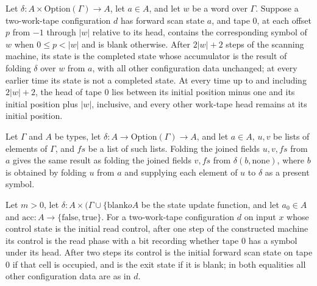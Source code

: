 \begin{theorem}
\label{Turing.rt_find_scan}
\leanok
{}
Let $\delta:A\times\mathrm{Option}(\Gamma)\to A$, let $a\in A$, and let $w$ be a word
over $\Gamma$. Suppose a two-work-tape configuration $d$ has forward scan state $a$, and
tape 0, at each offset $p$ from $-1$ through $|w|$ relative to its head, contains the
corresponding symbol of $w$ when $0\le p<|w|$ and is blank otherwise. After $2|w|+2$
steps of the scanning machine, its state is the completed state whose accumulator is the
result of folding $\delta$ over $w$ from $a$, with all other configuration data
unchanged; at every earlier time its state is not a completed state. At every time up to
and including $2|w|+2$, the head of tape 0 lies between its initial position minus one
and its initial position plus $|w|$, inclusive, and every other work-tape head remains
at its initial position.
\end{theorem}

\begin{theorem}
\label{Turing.rt_find_fold_cons}
\leanok
{}
Let $\Gamma$ and $A$ be types, let $\delta:A\to\mathrm{Option}(\Gamma)\to A$, and
let $a\in A$, $u,v$ be lists of elements of $\Gamma$, and $fs$ be a list of such lists.
Folding the joined fields $u,v,fs$ from $a$ gives the same result as folding the joined
fields $v,fs$ from $\delta(b,\mathrm{none})$, where $b$ is obtained by folding $u$
from $a$ and supplying each element of $u$ to $\delta$ as a present symbol.
\end{theorem}

\begin{theorem}
\label{Turing.rt_find_read}
\leanok
{}
Let $m>0$, let $\delta:A\times(\Gamma\cup\{\text{blank}	o A$ be the state update
function, and let $a_0\in A$ and $\mathrm{acc}:A\to\{\mathrm{false},\mathrm{true}\}$.
For a two-work-tape configuration $d$ on input $x$ whose control state is the initial
read control, after one step of the constructed machine its control is the read phase
with a bit recording whether tape 0 has a symbol under its head. After two steps its
control is the initial forward scan state on tape 0 if that cell is occupied, and is the
exit state if it is blank; in both equalities all other configuration data are as in
$d$.
\end{theorem}

